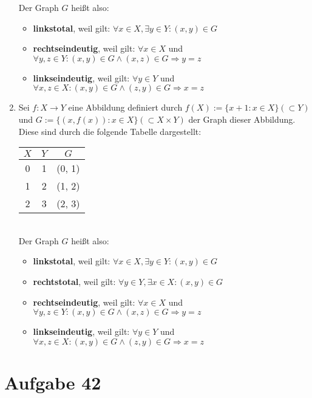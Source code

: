 \documentclass[10pt, oneside]{article}
\begin{document}
\begin{enumerate}
        \pagebreak
        Der Graph $G$ hei{\ss}t also:
        \begin{itemize}
            \item \textbf{linkstotal}, weil gilt: $\forall x \in X, \exists y \in Y : (x, y) \in G$
            \item \textbf{rechtseindeutig}, weil gilt: $\forall x \in X$ und $\forall y,z \in Y : (x, y) \in G \land (x, z) \in G \Rightarrow y = z$
            \item \textbf{linkseindeutig}, weil gilt: $\forall y \in Y$ und $\forall x,z \in X : (x, y) \in G \land (z, y) \in G \Rightarrow x = z$
        \end{itemize}
    \item Sei $f: X \rightarrow Y$ eine Abbildung definiert durch $f(X) :=
        \{x + 1 : x \in X\} (\subset Y)$ und $G := \{(x, f(x)) : x \in X\}
        (\subset X \times Y)$ der Graph dieser Abbildung. Diese sind durch die
        folgende Tabelle dargestellt:
        \begin{table*}[h]
            \centering
            \begin{tabular}{c|c|c}
                $X$ & $Y$ & $G$ \\
                \hline
                0  & 1 & (0,  1) \\
                1  & 2 & (1,  2) \\
                2  & 3 & (2,  3) \\
            \end{tabular}
        \end{table*} \\
        Der Graph $G$ hei{\ss}t also:
        \begin{itemize}
            \item \textbf{linkstotal}, weil gilt: $\forall x \in X, \exists y \in Y : (x, y) \in G$
            \item \textbf{rechtstotal}, weil gilt: $\forall y \in Y, \exists x \in X: (x, y) \in G$
            \item \textbf{rechtseindeutig}, weil gilt: $\forall x \in X$ und $\forall y,z \in Y : (x, y) \in G \land (x, z) \in G \Rightarrow y = z$
            \item \textbf{linkseindeutig}, weil gilt: $\forall y \in Y$ und $\forall x,z \in X : (x, y) \in G \land (z, y) \in G \Rightarrow x = z$
        \end{itemize}
\end{enumerate}

\section{Aufgabe 42}
\end{document}
